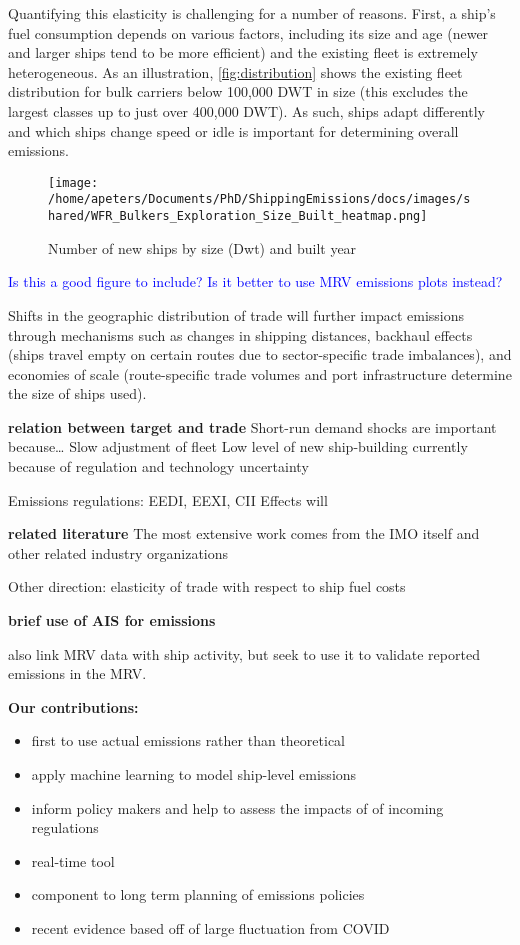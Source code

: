 \documentclass[hidelinks, 12pt,letterpaper]{article}
\begin{document}
Quantifying this elasticity is challenging for a number of reasons. First, a ship's fuel consumption depends on various factors, including its size and age (newer and larger ships tend to be more efficient) and the existing fleet is extremely heterogeneous. As an illustration, \autoref{fig:distribution} shows the existing fleet distribution for bulk carriers below 100,000 DWT in size (this excludes the largest classes up to just over 400,000 DWT). As such, ships adapt differently and which ships change speed or idle is important for determining overall emissions.

\begin{figure}[h]
  \centering
  \texttt{[image: /home/apeters/Documents/PhD/ShippingEmissions/docs/images/shared/WFR\_Bulkers\_Exploration\_Size\_Built\_heatmap.png]}
  \caption{Number of new ships by size (Dwt) and built year}
  \label{fig:distribution}
\end{figure}

\textcolor{blue}{Is this a good figure to include? Is it better to use MRV emissions plots instead?}

Shifts in the geographic distribution of trade will further impact emissions through mechanisms such as changes in shipping distances, backhaul effects (ships travel empty on certain routes due to sector-specific trade imbalances), and economies of scale (route-specific trade volumes and port infrastructure determine the size of ships used).


\textbf{relation between target and trade}
Short-run demand shocks are important because\dots
Slow adjustment of fleet
Low level of new ship-building currently because of regulation and technology uncertainty

Emissions regulations: EEDI, EEXI, CII
Effects will 

\textbf{related literature}
The most extensive work comes from the IMO itself and other related industry organizations \citep{faber2020fourth, olmer2017greenhouse}

Other direction: elasticity of trade with respect to ship fuel costs \citep{brancaccio2018impact}

\textbf{brief use of AIS for emissions}
\citet{faber2020fourth,olmer2017greenhouse}

\citet{uge2020estimation} also link MRV data with ship activity, but seek to use it to validate reported emissions in the MRV.

\textbf{Our contributions:}
\begin{itemize}
  \item first to use actual emissions rather than theoretical
  \item apply machine learning to model ship-level emissions
  \item inform policy makers and help to assess the impacts of of incoming regulations
  \item real-time tool
  \item component to long term planning of emissions policies
  \item recent evidence based off of large fluctuation from COVID
\end{itemize}
\end{document}
